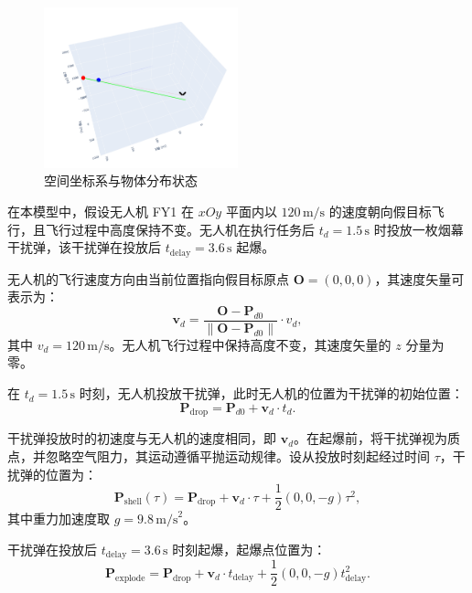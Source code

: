 \documentclass[12pt]{article}
\begin{document}
\begin{CJK}{UTF8}{gbsn}
		\begin{figure}[H]
			\centering
			\includegraphics[width=0.5\textwidth]{pic/Fg1.png}
			\caption{空间坐标系与物体分布状态}
			\label{fig:spatial_distribution}
		\end{figure}
		
		在本模型中，假设无人机 FY1 在 $xOy$ 平面内以 $120 \, \mathrm{m/s}$ 的速度朝向假目标飞行，且飞行过程中高度保持不变。无人机在执行任务后 $t_d = 1.5 \, \mathrm{s}$ 时投放一枚烟幕干扰弹，该干扰弹在投放后 $t_{\text{delay}} = 3.6 \, \mathrm{s}$ 起爆。
		
		无人机的飞行速度方向由当前位置指向假目标原点 $\mathbf{O} = (0, 0, 0)$，其速度矢量可表示为：
		\begin{equation}
			\mathbf{v}_d = \frac{\mathbf{O} - \mathbf{P}_{d0}}{\| \mathbf{O} - \mathbf{P}_{d0} \|} \cdot v_d,
		\end{equation}
		其中 $v_d = 120 \, \mathrm{m/s}$。无人机飞行过程中保持高度不变，其速度矢量的 $z$ 分量为零。
		
		在 $t_d = 1.5 \, \mathrm{s}$ 时刻，无人机投放干扰弹，此时无人机的位置为干扰弹的初始位置：
		\begin{equation}
			\mathbf{P}_{\text{drop}} = \mathbf{P}_{d0} + \mathbf{v}_d \cdot t_d.
		\end{equation}
		
		干扰弹投放时的初速度与无人机的速度相同，即 $\mathbf{v}_d$。在起爆前，将干扰弹视为质点，并忽略空气阻力，其运动遵循平抛运动规律。设从投放时刻起经过时间 $\tau$，干扰弹的位置为：
		\begin{equation}
			\mathbf{P}_{\text{shell}}(\tau) = \mathbf{P}_{\text{drop}} + \mathbf{v}_d \cdot \tau + \frac{1}{2} (0, 0, -g) \tau^2,
		\end{equation}
		其中重力加速度取 $g = 9.8 \, \mathrm{m/s}^2$。
		
		干扰弹在投放后 $t_{\text{delay}} = 3.6 \, \mathrm{s}$ 时刻起爆，起爆点位置为：
		\begin{equation}
			\mathbf{P}_{\text{explode}} = \mathbf{P}_{\text{drop}} + \mathbf{v}_d \cdot t_{\text{delay}} + \frac{1}{2} (0, 0, -g) t_{\text{delay}}^2.
		\end{equation}
		

\end{CJK}
\end{document}

